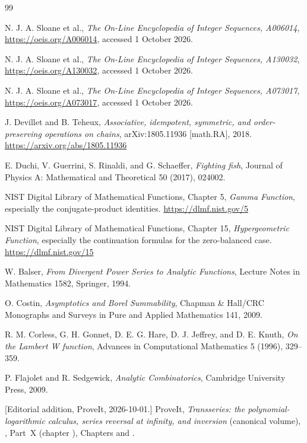 \documentclass[11pt,a4paper]{article}
\theoremstyle{definition}
\theoremstyle{remark}
\begin{document}
\begin{thebibliography}{99}

N. J. A. Sloane et al.,
\emph{The On-Line Encyclopedia of Integer Sequences, A006014},
\url{https://oeis.org/A006014}, accessed 1 October 2026.

N. J. A. Sloane et al.,
\emph{The On-Line Encyclopedia of Integer Sequences, A130032},
\url{https://oeis.org/A130032}, accessed 1 October 2026.

N. J. A. Sloane et al.,
\emph{The On-Line Encyclopedia of Integer Sequences, A073017},
\url{https://oeis.org/A073017}, accessed 1 October 2026.

J. Devillet and B. Teheux,
\emph{Associative, idempotent, symmetric, and order-preserving operations on chains},
arXiv:1805.11936 [math.RA], 2018.
\url{https://arxiv.org/abs/1805.11936}

E. Duchi, V. Guerrini, S. Rinaldi, and G. Schaeffer,
\emph{Fighting fish},
Journal of Physics A: Mathematical and Theoretical 50 (2017), 024002.

NIST Digital Library of Mathematical Functions,
Chapter 5, \emph{Gamma Function}, especially the conjugate-product identities.
\url{https://dlmf.nist.gov/5}

NIST Digital Library of Mathematical Functions,
Chapter 15, \emph{Hypergeometric Function}, especially the continuation formulas for the zero-balanced case.
\url{https://dlmf.nist.gov/15}

W. Balser,
\emph{From Divergent Power Series to Analytic Functions},
Lecture Notes in Mathematics 1582, Springer, 1994.

O. Costin,
\emph{Asymptotics and Borel Summability},
Chapman \& Hall/CRC Monographs and Surveys in Pure and Applied Mathematics 141, 2009.

R. M. Corless, G. H. Gonnet, D. E. G. Hare, D. J. Jeffrey, and D. E. Knuth,
\emph{On the Lambert W function},
Advances in Computational Mathematics 5 (1996), 329--359.

P. Flajolet and R. Sedgewick,
\emph{Analytic Combinatorics},
Cambridge University Press, 2009.

[Editorial addition, ProveIt, 2026-10-01.] ProveIt, \emph{Transseries: the
polynomial-logarithmic calculus, series reversal at infinity, and
inversion} (canonical volume),
,
Part~X (chapter ), Chapters  and
.

\end{thebibliography}
\end{document}
